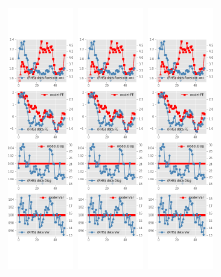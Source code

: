 \documentclass[]{article}
\begin{document}
\begin{figure}[htbp]
\begin{subfigure}[b]{\textwidth}
		\includegraphics[width=0.19\textwidth]{figures/sce_se_est_joint_diag0.png}
		\includegraphics[width=0.19\textwidth]{figures/sce_se_est_joint_diag1.png}
		\includegraphics[width=0.19\textwidth]{figures/sce_se_est_joint_diag2.png}

\end{subfigure}
\end{figure}
\end{document}
